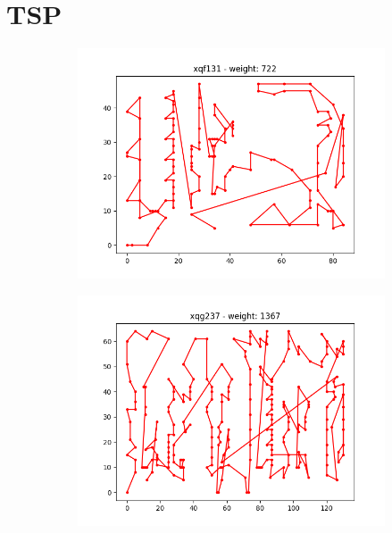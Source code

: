 \documentclass{article}
\def\v{0.4}
\begin{document}
\section{TSP}
\begin{figure}[h!]
	\centering
	\begin{subfigure}[b]{\v\linewidth}
		\includegraphics[width=\linewidth]{graphs/TSP_xqf131.png}
	\end{subfigure}
	\begin{subfigure}[b]{\v\linewidth}
		\includegraphics[width=\linewidth]{graphs/TSP_xqg237.png}
	\end{subfigure}
	\begin{subfigure}[b]{\v\linewidth}

\end{subfigure}
\end{figure}
\end{document}
